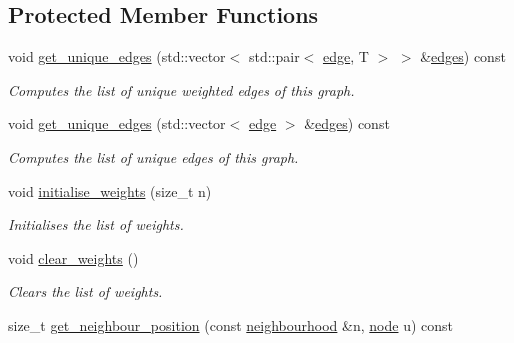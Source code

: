 \subsection*{Protected Member Functions}
\begin{DoxyCompactItemize}
\item 
void \hyperlink{classlgraph_1_1wugraph_af0172a57b7e544029b849f096811c36f}{get\+\_\+unique\+\_\+edges} (std\+::vector$<$ std\+::pair$<$ \hyperlink{namespacelgraph_a76bd7d50719f03de7a85db259d80d572}{edge}, T $>$ $>$ \&\hyperlink{classlgraph_1_1wxgraph_a1b89f56544185e33d54e72a8ed19a789}{edges}) const
\begin{DoxyCompactList}\small\item\em Computes the list of unique weighted edges of this graph. \end{DoxyCompactList}\item 
void \hyperlink{classlgraph_1_1wugraph_a455d1df8d3799b70a23b5b9944cbafb7}{get\+\_\+unique\+\_\+edges} (std\+::vector$<$ \hyperlink{namespacelgraph_a76bd7d50719f03de7a85db259d80d572}{edge} $>$ \&\hyperlink{classlgraph_1_1wxgraph_a1b89f56544185e33d54e72a8ed19a789}{edges}) const
\begin{DoxyCompactList}\small\item\em Computes the list of unique edges of this graph. \end{DoxyCompactList}\item 
\mbox{\label{classlgraph_1_1wxgraph_a3d0eed0195489df5db3e9383a5c91344}} 
void \hyperlink{classlgraph_1_1wxgraph_a3d0eed0195489df5db3e9383a5c91344}{initialise\+\_\+weights} (size\+\_\+t n)
\begin{DoxyCompactList}\small\item\em Initialises the list of weights. \end{DoxyCompactList}\item 
\mbox{\label{classlgraph_1_1wxgraph_a805868af4e350ccb6a4555cff3822d22}} 
void \hyperlink{classlgraph_1_1wxgraph_a805868af4e350ccb6a4555cff3822d22}{clear\+\_\+weights} ()
\begin{DoxyCompactList}\small\item\em Clears the list of weights. \end{DoxyCompactList}\item 
size\+\_\+t \hyperlink{classlgraph_1_1xxgraph_abb0c474cb162940aba3439124c1202d7}{get\+\_\+neighbour\+\_\+position} (const \hyperlink{namespacelgraph_a052e7766c13f3a43cec0aec8173fdede}{neighbourhood} \&n, \hyperlink{namespacelgraph_a397169dd66adf725210a30fb7251773e}{node} u) const

\end{DoxyCompactItemize}
